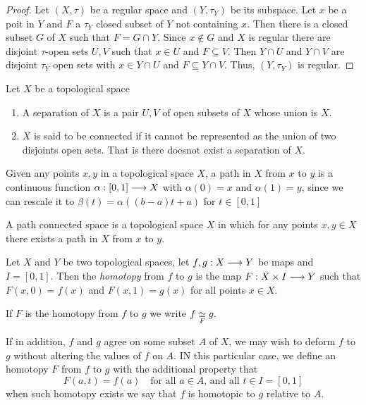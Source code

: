 \begin{proof}
    Let $(X, \tau)$ be a regular space and $(Y, \tau_Y)$ be its subspace. Let $x$ be a poit in $Y$ and $F$ a $\tau_Y$ closed subset of $Y$ not containing $x$. Then there is a closed subset $G$ of $X$ such that $F  = G \cap Y$. Since $x \notin G$ and $X$ is regular there are disjoint $\tau$-open sets $U, V$ such that $x \in U$ and $F \subseteq V$. Then $Y \cap U$ and $Y \cap V$ are disjoint $\tau_Y$ open sets with $x \in Y \cap U$ and $F \subseteq Y \cap V$. Thus, $(Y, \tau_Y)$ is regular.
\end{proof}

\begin{defn}
    Let $X$ be a topological space 
    \begin{enumerate}
        \item A separation of $X$ is a pair $U,V$ of open subsets of $X$ whose union is $X$.
        \item $X$ is said to be connected if it cannot be represented as the union of two disjoints open sets. That is there doesnot exist a separation of $X$.
    \end{enumerate}
\end{defn}

\begin{defn}[Path]
    Given any points $x,y$ in a topological space $X$, a path in $X$ from $x$ to $y$ is a continuous function $\alpha : [0,1] \longrightarrow X$ with $\alpha(0) = x$ and $\alpha(1) = y$, since we can rescale it to $\beta(t) = \alpha((b-a)t + a)$ for $t \in [0,1]$
\end{defn}
\begin{defn}
    A path connected space is a topological space $X$ in which for any points $x,y \in X$ there exists a path in $X$ from $x$ to $y$.
\end{defn}

\begin{defn}[Homotopy]
Let $X$ and $Y$ be two topological spaces, let $f,g : X \longrightarrow Y$ be maps and $I = [0,1]$. Then the \textit{homotopy} from $f$ to $g$ is the map $F: X \times I \longrightarrow Y$ such that $F(x,0) = f(x)$ and $F(x,1) = g(x)$ for all points $x \in X$.
\end{defn}

\begin{notn}
If $F$ is the homotopy from $f$ to $g$ we write $\displaystyle f \underset{F}{\simeq} g.$
\end{notn}

If in addition, $f$ and $g$ agree on some subset $A$ of $X$, we may wish to deform $f$ to $g$ without altering the values of $f$ on $A$. IN this particular case, we define an homotopy $F$ from $f$ to $g$ with the additional property that 
\[
    F(a,t) = f(a) \quad \text{for all $a \in A$, and all $t \in I = [0,1]$}  
\]
when such homotopy exists we say that $f$ is homotopic to $g$ relative to $A$.

